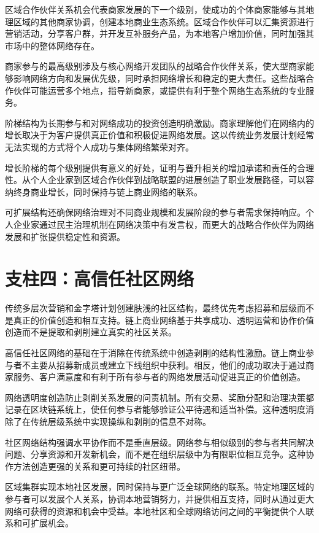 \documentclass[
  Letterpaper,
]{scrbook}
\begin{document}
区域合作伙伴关系机会代表商家发展的下一个级别，使成功的个体商家能够与其地理区域的其他商家协调，创建本地商业生态系统。区域合作伙伴可以汇集资源进行营销活动，分享客户群，并开发互补服务产品，为本地客户增加价值，同时加强其市场中的整体网络存在。

商家参与的最高级别涉及与核心网络开发团队的战略合作伙伴关系，使大型商家能够影响网络方向和发展优先级，同时承担网络增长和稳定的更大责任。这些战略合作伙伴可能运营多个地点，指导新商家，或提供有利于整个网络生态系统的专业服务。

阶梯结构为长期参与和对网络成功的投资创造明确激励。商家理解他们在网络内的增长取决于为客户提供真正价值和积极促进网络发展。这以传统业务发展计划经常无法实现的方式将个人成功与集体网络繁荣对齐。

增长阶梯的每个级别提供有意义的好处，证明与晋升相关的增加承诺和责任的合理性。从个人企业家到区域合作伙伴到战略联盟的进展创造了职业发展路径，可以容纳终身商业增长，同时保持与链上商业网络的联系。

可扩展结构还确保网络治理对不同商业规模和发展阶段的参与者需求保持响应。个人企业家通过民主治理机制在网络决策中有发言权，而更大的战略合作伙伴为网络发展和扩张提供稳定性和资源。

\section{支柱四：高信任社区网络}\label{ux652fux67f1ux56dbux9ad8ux4fe1ux4efbux793eux533aux7f51ux7edc}

传统多层次营销和金字塔计划创建肤浅的社区结构，最终优先考虑招募和层级而不是真正的价值创造和相互支持。链上商业网络基于共享成功、透明运营和协作价值创造而不是提取和剥削建立真实的社区关系。

高信任社区网络的基础在于消除在传统系统中创造剥削的结构性激励。链上商业参与者不主要从招募新成员或建立下线组织中获利。相反，他们的成功取决于通过商家服务、客户满意度和有利于所有参与者的网络发展活动促进真正的价值创造。

网络透明度创造防止剥削关系发展的问责机制。所有交易、奖励分配和治理决策都记录在区块链系统上，使任何参与者能够验证公平待遇和适当补偿。这种透明度消除了在传统层级系统中实现操纵和剥削的信息不对称。

社区网络结构强调水平协作而不是垂直层级。网络参与相似级别的参与者共同解决问题、分享资源和开发新机会，而不是在组织层级中为有限职位相互竞争。这种协作方法创造更强的关系和更可持续的社区纽带。

区域集群实现本地社区发展，同时保持与更广泛全球网络的联系。特定地理区域的参与者可以发展个人关系，协调本地营销努力，并提供相互支持，同时从通过更大网络可获得的资源和机会中受益。本地社区和全球网络访问之间的平衡提供个人联系和可扩展机会。
\end{document}
